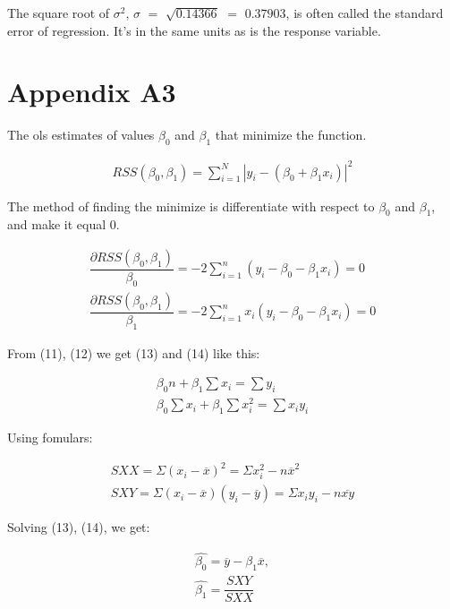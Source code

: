 \documentclass{article}
\begin{document}
    The square root of $\sigma ^ 2$, $\sigma$ $=$ $\sqrt{0.14366}$ $=$ $0.37903$, is often called the standard error of regression. It's in the same units as is the response variable.
    
\section{Appendix A3} 
    The ols estimates of values ${\beta_{0}}$ and ${\beta_{1}}$ that minimize the function.
    
    \begin{align}
        RSS(\beta_{0}, \beta_{1}) = \displaystyle \sum _{i = 1} ^ {N}   |y_{i} - (\beta_{0} + \beta_{1} x_{i})| ^ 2
    \end{align}
    
    The method of finding the minimize is differentiate with respect to $\beta_{0}$ and $\beta_{1}$, and make it equal $0$. 
    
    \begin{align} 
        \dfrac{\partial RSS(\beta_{0}, \beta_{1}) }{\beta_{0}} = -2 \displaystyle \sum _{i=1}^{n}  (y_{i} - \beta_{0} - \beta_{1} x_{i}) = 0
        \\
        \dfrac{\partial RSS(\beta_{0}, \beta_{1}) }{\beta_{1}} = -2 \displaystyle \sum _{i=1}^{n}  x_{i} (y_{i} - \beta_{0} - \beta_{1} x_{i}) = 0
    \end{align}
        
    From (11), (12) we get (13) and (14) like this: 
    
    \begin{align} 
        \beta_{0} n + \beta_{1} \displaystyle \sum x_{i} = \displaystyle \sum y_{i}
        \\
        \beta_{0} \displaystyle \sum x_{i} + \beta_{1} \displaystyle \sum x_{i}^2 = \displaystyle \sum x_{i} y_{i}
    \end{align}
        
    Using fomulars: 
    
     \begin{align} 
        SXX = \Sigma (x_{i} - \overline{x})^2 = \Sigma x_{i}^2 - n\overline{x}^2 
        \\
        SXY = \Sigma (x_{i} - \overline{x})(y_{i} - \overline{y}) = \Sigma x_{i}y_{i} - n\overline{xy}
    \end{align}
        
    Solving (13), (14), we get:
    
    \begin{align} 
        \hat{\beta_{0}} = \overline{y} - \beta_{1}\overline{x}, 
        \\
        \hat{\beta_{1}} = \dfrac{SXY}{SXX}
    \end{align}
    
\end{document}
